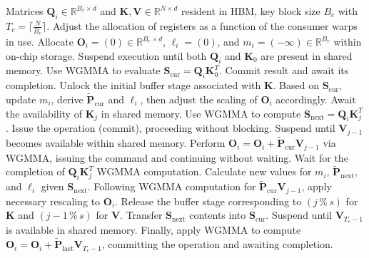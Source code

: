\begin{algorithm}[H]
    \caption{\small\label{alg:flash3_wgmma}\textsc{FlashAttention-3} Consumer Warpgroup Forward Pass}
    \begin{algorithmic}[1]
      \REQUIRE  Matrices $\mathbf{Q}_i \in \mathbb{R}^{B_r \times d}$ and $\mathbf{K}, \mathbf{V} \in \mathbb{R}^{N \times d}$ resident in HBM, key block size $B_c$ with $T_c = \lceil \frac{N}{B_c} \rceil$.
      \STATE Adjust the allocation of registers as a function of the consumer warps in use.
      \STATE Allocate $\mathbf{O}_i = (0) \in \mathbb{R}^{B_r \times d}$, $\ell_i = (0)$, and $m_i = (-\infty) \in \mathbb{R}^{B_r}$ within on-chip storage.
      \STATE Suspend execution until both $\mathbf{Q}_i$ and $\mathbf{K}_0$ are present in shared memory.
      \STATE Use WGMMA to evaluate $\mathbf{S}_{\mathrm{cur}} = \mathbf{Q}_i \mathbf{K}_0^T$. Commit result and await its completion.
      \STATE Unlock the initial buffer stage associated with $\mathbf{K}$.
      \STATE Based on $\mathbf{S}_{\mathrm{cur}}$, update $m_{i}$, derive $\tilde{\mathbf{P}}_{\mathrm{cur}}$ and $\ell_{i}$, then adjust the scaling of $\mathbf{O}_i$ accordingly.
        \STATE Await the availability of $\mathbf{K}_j$ in shared memory.
        \label{code:mainloop_start}
        \STATE Use WGMMA to compute $\mathbf{S}_{\mathrm{next}} = \mathbf{Q}_i \mathbf{K}_{j}^T$. Issue the operation (commit), proceeding without blocking. \label{code:first_wgmma}
        \STATE Suspend until $\mathbf{V}_{j-1}$ becomes available within shared memory.
        \STATE Perform $\mathbf{O}_{i} = \mathbf{O}_{i} + \tilde{\mathbf{P}}_{\mathrm{cur}} \mathbf{V}_{j-1}$ via WGMMA, issuing the command and continuing without waiting. \label{code:second_wgmma}
        \STATE Wait for the completion of $\mathbf{Q}_i \mathbf{K}_{j}^T$ WGMMA computation.
        \STATE Calculate new values for $m_{i}$, $\tilde{\mathbf{P}}_{\mathrm{next}}$, and $\ell_{i}$ given $\mathbf{S}_{\mathrm{next}}$. \label{code:softmax}
        \STATE Following WGMMA computation for $\tilde{\mathbf{P}}_{\mathrm{cur}} \mathbf{V}_{j-1}$, apply necessary rescaling to $\mathbf{O}_i$.
        \STATE Release the buffer stage corresponding to $(j\,\%\,s)$ for $\mathbf{K}$ and $(j-1\,\%\,s)$ for $\mathbf{V}$.
        \STATE Transfer $\mathbf{S}_{\mathrm{next}}$ contents into $\mathbf{S}_{\mathrm{cur}}$.
        \label{code:mainloop_end}
      \ENDFOR \STATE Suspend until $\mathbf{V}_{T_c - 1}$ is available in shared memory.
      \STATE Finally, apply WGMMA to compute
      $\mathbf{O}_{i} = \mathbf{O}_{i} + \tilde{\mathbf{P}}_{\mathrm{last}} \mathbf{V}_{T_c - 1}$, committing the operation and awaiting completion.


\end{algorithmic}
\end{algorithm}
